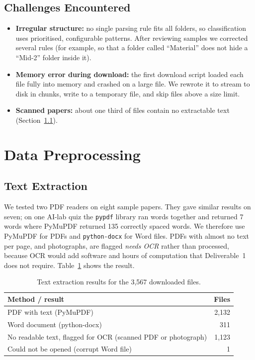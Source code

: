\documentclass[11pt,a4paper]{article}
\begin{document}
\subsection{Challenges Encountered}
\begin{itemize}
  \item \textbf{Irregular structure:} no single parsing rule fits all folders, so classification uses prioritised, configurable patterns. After reviewing samples we corrected several rules (for example, so that a folder called ``Material'' does not hide a ``Mid-2'' folder inside it).
  \item \textbf{Memory error during download:} the first download script loaded each file fully into memory and crashed on a large file. We rewrote it to stream to disk in chunks, write to a temporary file, and skip files above a size limit.
  \item \textbf{Scanned papers:} about one third of files contain no extractable text (Section~\ref{sec:extraction}).
\end{itemize}

\section{Data Preprocessing}

\subsection{Text Extraction}
\label{sec:extraction}
We tested two PDF readers on eight sample papers. They gave similar results on seven; on one AI-lab quiz the \texttt{pypdf} library ran words together and returned 7 words where PyMuPDF returned 135 correctly spaced words. We therefore use PyMuPDF for PDFs and \texttt{python-docx} for Word files. PDFs with almost no text per page, and photographs, are flagged \emph{needs OCR} rather than processed, because OCR would add software and hours of computation that Deliverable~1 does not require. Table~\ref{tab:extraction} shows the result.

\begin{table}[H]
\centering
\caption{Text extraction results for the 3{,}567 downloaded files.}
\label{tab:extraction}
\begin{tabular}{lr}
\toprule
Method / result & Files \\
\midrule
PDF with text (PyMuPDF) & 2{,}132 \\
Word document (python-docx) & 311 \\
No readable text, flagged for OCR (scanned PDF or photograph) & 1{,}123 \\
Could not be opened (corrupt Word file) & 1 \\
\bottomrule
\end{tabular}
\end{table}
\end{document}
